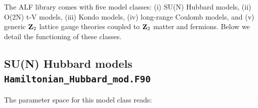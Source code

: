 


The ALF  library comes with five model classes: (i) SU(N) Hubbard models, (ii) O(2N) t-V models, (iii) Kondo models, (iv) long-range Coulomb models, and (v) generic $\mathbf{Z}_{2}$ lattice gauge theories coupled to $\mathbf{Z}_{2}$ matter and fermions. Below we detail the functioning of these classes.  


\subsection{SU(N) Hubbard models \texttt{Hamiltonian\_Hubbard\_mod.F90}} \label{sec:hubbard}

The parameter space for this model class  reads: 

